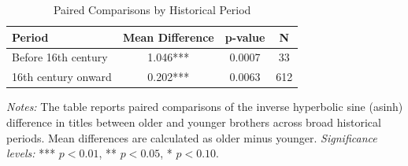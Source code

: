\begin{table}[H]
\centering
\caption{Paired Comparisons by Historical Period}
\label{tab:period_ttests}

\begin{tablebody}
\begin{tabular}{l c c c}
\toprule
\textbf{Period} & \textbf{Mean Difference} & \textbf{p-value} & \textbf{N} \\
\midrule

Before 16th century
& 1.046*** & 0.0007 & 33 \\

16th century onward
& 0.202*** & 0.0063 & 612 \\

\bottomrule
\end{tabular}
\end{tablebody}

\vspace{4pt}
\begin{minipage}{\textwidth}
\footnotesize
\textit{Notes:} The table reports paired comparisons of the inverse hyperbolic sine (asinh) difference in titles between older and younger brothers across broad historical periods. Mean differences are calculated as older minus younger. \textit{Significance levels:} *** $p<0.01$, ** $p<0.05$, * $p<0.10$.
\end{minipage}

\end{table}